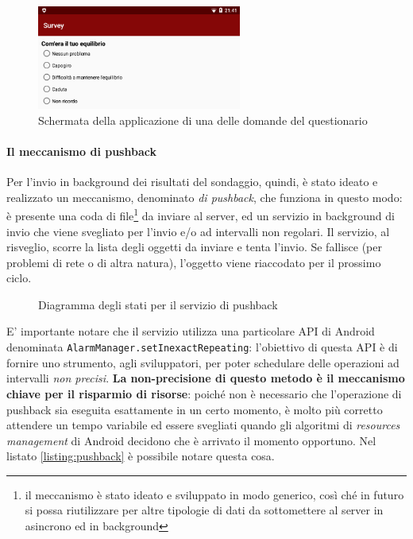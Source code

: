 \documentclass[a4paper,10pt]{memoir}
\begin{document}
\begin{figure}[ht]
\centering
\label{fig:survey1}
\includegraphics[width=0.6\textwidth]{app/survey2}
\caption{Schermata della applicazione di una delle domande del questionario}
\end{figure}

\paragraph{Il meccanismo di pushback} Per l'invio in background dei risultati del sondaggio, quindi, è stato ideato e realizzato un meccanismo, denominato \textit{di pushback}, che funziona in questo modo: è presente una coda di file\footnote{il meccanismo è stato ideato e sviluppato in modo generico, così ché in futuro si possa riutilizzare per altre tipologie di dati da sottomettere al server in asincrono ed in background} da inviare al server, ed un servizio in background di invio che viene svegliato per l'invio e/o ad intervalli non regolari. Il servizio, al risveglio, scorre la lista degli oggetti da inviare e tenta l'invio. Se fallisce (per problemi di rete o di altra natura), l'oggetto viene riaccodato per il prossimo ciclo.

\begin{figure}[ht]
\centering
\caption{Diagramma degli stati per il servizio di pushback}
\label{fig:scs_pb1}
\end{figure}

E' importante notare che il servizio utilizza una particolare API di Android denominata \texttt{AlarmManager.setInexactRepeating}: l'obiettivo di questa API è di fornire uno strumento, agli sviluppatori, per poter schedulare delle operazioni ad intervalli \textit{non precisi}. \textbf{La non-precisione di questo metodo è il meccanismo chiave per il risparmio di risorse}: poiché non è necessario che l'operazione di pushback sia eseguita esattamente in un certo momento, è molto più corretto attendere un tempo variabile ed essere svegliati quando gli algoritmi di \textit{resources management} di Android decidono che è arrivato il momento opportuno. Nel listato \ref{listing:pushback} è possibile notare questa cosa.
\end{document}
